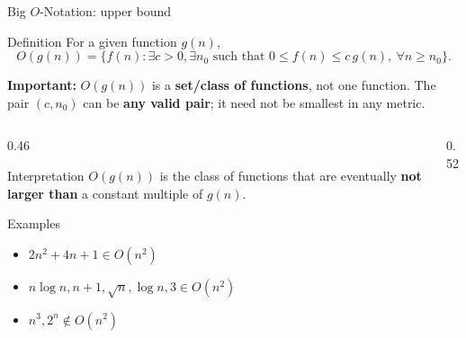 \documentclass[aspectratio=169]{beamer}
\begin{document}
\begin{frame}{Big $O$-Notation: upper bound}
  \small
  \begin{block}{Definition}
    For a given function $g(n)$,
    \[
      O(g(n))=\{f(n): \exists c>0,\exists n_0\text{ such that }
      0\le f(n)\le c\,g(n),\ \forall n\ge n_0\}.
    \]
  \end{block}
  {\small\color{red!75!black}\textbf{Important:} $O(g(n))$ is a \textbf{set/class of functions}, not one function. The pair $(c,n_0)$ can be \textbf{any valid pair}; it need not be smallest in any metric.}\vspace{-0.35em}
  \begin{columns}[T]
    \begin{column}{0.46\textwidth}
      \begin{exampleblock}{Interpretation}
        $O(g(n))$ is the class of functions that are eventually \textbf{not larger than}
        a constant multiple of $g(n)$.
      \end{exampleblock}
      \begin{alertblock}{Examples}
        \scriptsize
        \begin{itemize}\setlength{\itemsep}{0.1em}
          \item $2n^2+4n+1\in O(n^2)$
          \item $n\log n,n+1,\sqrt n,\log n,3\in O(n^2)$
          \item $n^3,2^n\notin O(n^2)$
        \end{itemize}
      \end{alertblock}
    \end{column}
    \begin{column}{0.52\textwidth}
      \begin{center}
      \end{center}
    \end{column}
  \end{columns}
\end{frame}
\end{document}
